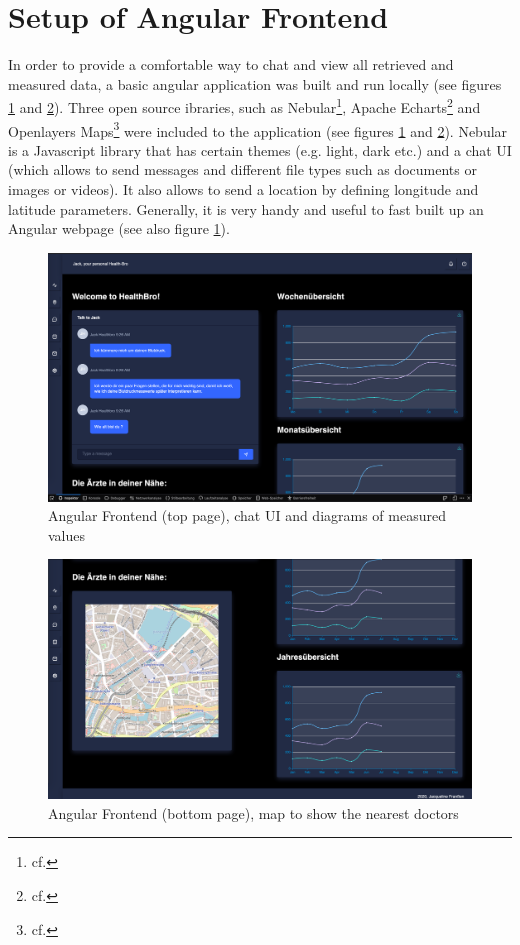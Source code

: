 \section{Setup of Angular Frontend} \label{frontend}
In order to provide a comfortable way to chat and view all retrieved and measured data, a basic angular application was built and run locally (see figures \ref{angular_01} and \ref{angular_02}). Three open source ibraries, such as Nebular\footnote{cf.\autocite{nebular}}, Apache Echarts\footnote{cf.\autocite{echarts}} and Openlayers Maps\footnote{cf.\autocite{openlayers}} were included to the application (see figures \ref{angular_01} and \ref{angular_02}). Nebular is a Javascript library that has certain themes (e.g. light, dark etc.) and a chat UI (which allows to send messages and different file types such as documents or images or videos). It also allows to send a location by defining longitude and latitude parameters. Generally, it is very handy and useful to fast built up an Angular webpage (see also figure \ref{angular_01}).

\begin{figure}[h]
	\centering
	\includegraphics[width=1\textwidth]{images/angular_01.png}
	\caption{Angular Frontend (top page), chat UI and diagrams of measured values}
	\label{angular_01}
\end{figure}
\begin{figure}[h]
	\centering
	\includegraphics[width=1\textwidth]{images/angular_02.png}
	\caption{Angular Frontend (bottom page), map to show the nearest doctors}
	\label{angular_02}
\end{figure}

